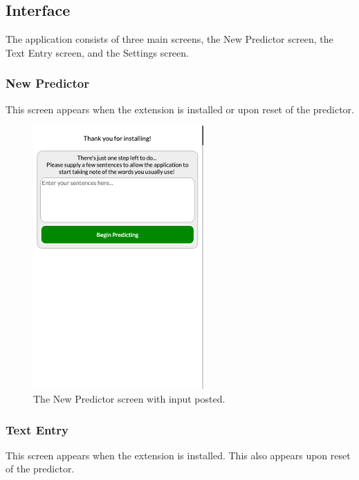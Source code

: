 \documentclass[journal]{./IEEE/IEEEtran}
\begin{document}
\subsection{Interface}
The application consists of three main screens, the New Predictor screen, the Text Entry screen, and the Settings screen.

\subsubsection{New Predictor}
This screen appears when the extension is installed or upon reset of the predictor.

\begin{figure}[!ht]
\begin{center}

\includegraphics[width=65mm]{images/initial-input.png}
\caption{The New Predictor screen with input posted.}

\end{center}
\end{figure}

\subsubsection{Text Entry}
This screen appears when the extension is installed. This also appears upon reset of the predictor.
\end{document}
